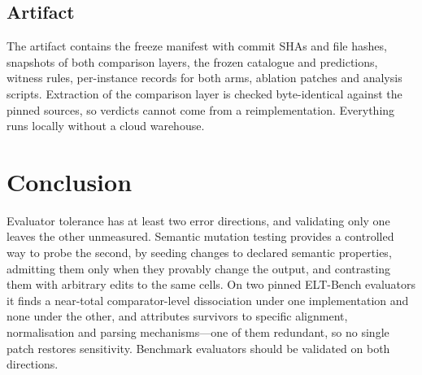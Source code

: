 \documentclass[10pt,conference]{IEEEtran}
\begin{document}
\subsection{Artifact}

The artifact contains the freeze manifest with commit SHAs and file hashes,
snapshots of both comparison layers, the frozen catalogue and predictions, witness
rules, per-instance records for both arms, ablation patches and analysis scripts.
Extraction of the comparison layer is checked byte-identical against the pinned
sources, so verdicts cannot come from a reimplementation. Everything runs locally
without a cloud warehouse.

\section{Conclusion}

Evaluator tolerance has at least two error directions, and validating only one
leaves the other unmeasured. Semantic mutation testing provides a controlled way to
probe the second, by seeding changes to declared semantic properties, admitting
them only when they provably change the output, and contrasting them with
arbitrary edits to the same cells. On two pinned ELT-Bench evaluators it finds a near-total comparator-level
dissociation under one implementation and none under the other, and attributes
survivors to specific alignment, normalisation and parsing mechanisms---one of
them redundant, so no single patch restores sensitivity. Benchmark evaluators
should be validated on both directions.
\end{document}

